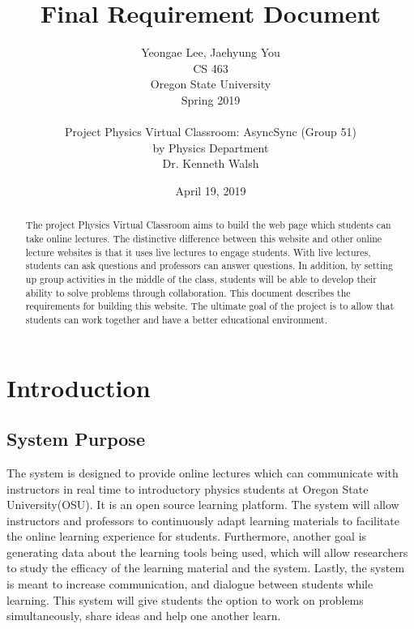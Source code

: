 \documentclass[10pt]{article}
\begin{document}
\begin{titlepage}
    \title{Final Requirement Document}
    \author{Yeongae Lee, Jaehyung You \\ CS 463  \\ Oregon State University \\ Spring 2019 \\ \\ Project Physics Virtual Classroom: AsyncSync (Group 51) \\by Physics Department \\Dr. Kenneth Walsh}
    \date {April 19, 2019}

  
    \maketitle
        \begin{abstract}
            The project Physics Virtual Classroom aims to build the web page which students can take online lectures. The distinctive difference between this website and other online lecture websites is that it uses live lectures to engage students. With live lectures, students can ask questions and professors can answer questions. In addition, by setting up group activities in the middle of the class, students will be able to develop their ability to solve problems through collaboration. This document describes the requirements for building this website. The ultimate goal of the project is to allow that students can work together and have a better educational environment. 
        \end{abstract}     
\end{titlepage}
\newpage


\section{Introduction}
    \subsection{System Purpose}
        The system is designed to provide online lectures which can communicate with instructors in real time to introductory physics students at Oregon State University(OSU). It is an open source learning platform. The system will allow instructors and professors to continuously adapt learning materials to facilitate the online learning experience for students. Furthermore, another goal is generating data about the learning tools being used, which will allow researchers to study the efficacy of the learning material and the system. Lastly, the system is meant to increase communication, and dialogue between students while learning. This system will give students the option to work on problems simultaneously, share ideas and help one another learn.
\end{document}
